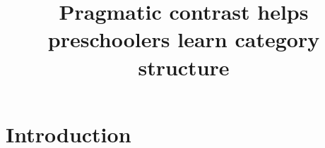 \documentclass[man]{apa2}
\title{Pragmatic contrast helps preschoolers learn category structure}
\begin{document}
\maketitle                            


\section{Introduction}






\end{document}
